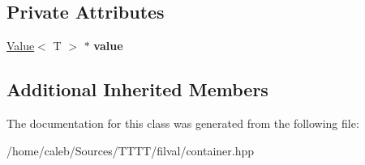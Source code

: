 \subsection*{Private Attributes}
\begin{DoxyCompactItemize}
\item 
\hypertarget{classfilval_1_1ContainerVector_a11a0bf99596eb08c9f2a7f21b956c911}{}\label{classfilval_1_1ContainerVector_a11a0bf99596eb08c9f2a7f21b956c911} 
\hyperlink{classfilval_1_1Value}{Value}$<$ T $>$ $\ast$ {\bfseries value}
\end{DoxyCompactItemize}
\subsection*{Additional Inherited Members}


The documentation for this class was generated from the following file\+:\begin{DoxyCompactItemize}
\item 
/home/caleb/\+Sources/\+T\+T\+T\+T/filval/container.\+hpp\end{DoxyCompactItemize}
